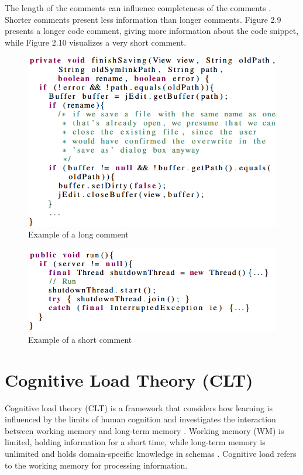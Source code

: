 The length of the comments can influence completeness of the comments \cite{steidl2013quality}. Shorter comments present less information than longer comments. Figure 2.9 presents a longer code comment, giving more information about the code snippet, while Figure 2.10 visualizes a very short comment.

\begin{figure} [H]
  \centering
  \includegraphics [scale=1]
  {figures/long.png}
  \caption{Example of a long comment
  \cite[p. 6]{steidl2013quality}}
  \label{fig:AnhangsChor}
\end{figure}

\begin{figure} [H]
  \centering
  \includegraphics [scale=0.9]
  {figures/run1.png}
  \caption{Example of a short comment
  \cite[p. 6]{steidl2013quality}}
  \label{fig:AnhangsChor}
\end{figure}





\section{Cognitive Load Theory (CLT)}
Cognitive load theory (CLT) is a framework that considers how learning is influenced by the limits of human cognition and investigates the interaction between working memory and long-term memory \cite{duran2022cognitive}. Working memory (WM) is limited, holding information for a short time, while long-term memory is unlimited and holds domain-specific knowledge in schemas  \cite{zavgorodniaia2020measuring}.
Cognitive load refers to the working memory for processing information. 

